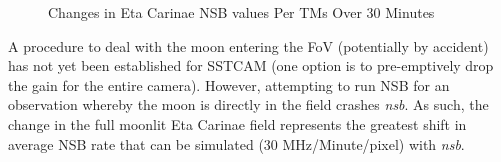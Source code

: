 \begin{figure}[ht]
\begin{minipage}{\linewidth}\centering
{}
\caption{Changes in Eta Carinae NSB values Per TMs Over 30 Minutes}
\label{fig:30minsetacarTM}
\end{minipage}
\end{figure} 
A procedure to deal with the moon entering the FoV (potentially by accident) has not yet been established for SSTCAM (one option is to pre-emptively drop the gain for the entire camera). However, attempting to run NSB for an observation whereby the moon is directly in the field crashes \textit{nsb}. As such, the change in the full moonlit Eta Carinae field represents the greatest shift in average NSB rate that can be simulated (30 MHz/Minute/pixel) with \textit{nsb}.


